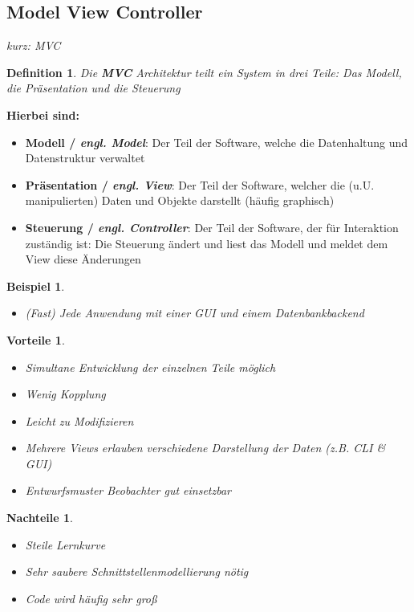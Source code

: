 \documentclass[a4paper]{article}
\theoremstyle{break}
\newtheorem{defi}{Definition}[section]
\newtheorem{ex}{Beispiel}[section]
\newtheorem{why}{Vorteile}[section]
\newtheorem{whynot}{Nachteile}[section]
\begin{document}
\subsection{Model View Controller}
\textit{kurz: MVC}
\begin{defi}
	Die \textbf{MVC} Architektur teilt ein System in drei Teile: Das Modell, die Präsentation und die Steuerung
\end{defi}
\textbf{Hierbei sind:}
\begin{itemize}
	\item \textbf{Modell / \textit{engl. Model}}: Der Teil der Software, welche die Datenhaltung und Datenstruktur verwaltet
	\item \textbf{Präsentation / \textit{engl. View}}: Der Teil der Software, welcher die (u.U. manipulierten) Daten und Objekte darstellt (häufig graphisch)
	\item \textbf{Steuerung / \textit{engl. Controller}}: Der Teil der Software, der für Interaktion zuständig ist: Die Steuerung ändert und liest das Modell und meldet dem View diese Änderungen
\end{itemize}
\begin{ex}
	\begin{itemize}
		\item (Fast) Jede Anwendung mit einer GUI und einem Datenbankbackend  
	\end{itemize}
\end{ex}
\begin{why}
	\begin{itemize}
		\item Simultane Entwicklung der einzelnen Teile möglich
		\item Wenig Kopplung
		\item Leicht zu Modifizieren
		\item Mehrere Views erlauben verschiedene Darstellung der Daten (z.B. CLI \& GUI)
		\item Entwurfsmuster Beobachter gut einsetzbar
	\end{itemize}
\end{why}
\begin{whynot}
	\begin{itemize}
		\item Steile Lernkurve
		\item Sehr saubere Schnittstellenmodellierung nötig
		\item Code wird häufig sehr groß
	\end{itemize}
\end{whynot}
\end{document}
